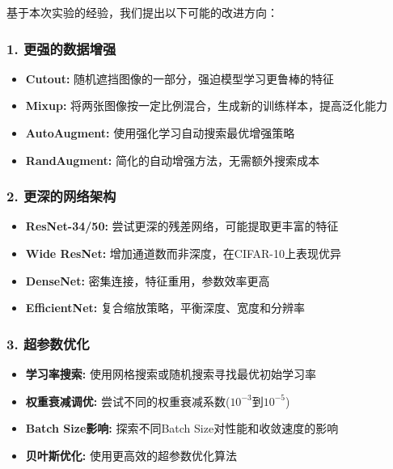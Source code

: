 \documentclass[12pt,a4paper]{article}
\begin{document}
基于本次实验的经验，我们提出以下可能的改进方向：

\subsubsection{1. 更强的数据增强}

\begin{itemize}[leftmargin=2em]
    \item \textbf{Cutout:} 随机遮挡图像的一部分，强迫模型学习更鲁棒的特征
    \item \textbf{Mixup:} 将两张图像按一定比例混合，生成新的训练样本，提高泛化能力
    \item \textbf{AutoAugment:} 使用强化学习自动搜索最优增强策略
    \item \textbf{RandAugment:} 简化的自动增强方法，无需额外搜索成本
\end{itemize}

\subsubsection{2. 更深的网络架构}

\begin{itemize}[leftmargin=2em]
    \item \textbf{ResNet-34/50:} 尝试更深的残差网络，可能提取更丰富的特征
    \item \textbf{Wide ResNet:} 增加通道数而非深度，在CIFAR-10上表现优异
    \item \textbf{DenseNet:} 密集连接，特征重用，参数效率更高
    \item \textbf{EfficientNet:} 复合缩放策略，平衡深度、宽度和分辨率
\end{itemize}

\subsubsection{3. 超参数优化}

\begin{itemize}[leftmargin=2em]
    \item \textbf{学习率搜索:} 使用网格搜索或随机搜索寻找最优初始学习率
    \item \textbf{权重衰减调优:} 尝试不同的权重衰减系数($10^{-3}$到$10^{-5}$)
    \item \textbf{Batch Size影响:} 探索不同Batch Size对性能和收敛速度的影响
    \item \textbf{贝叶斯优化:} 使用更高效的超参数优化算法
\end{itemize}
\end{document}
